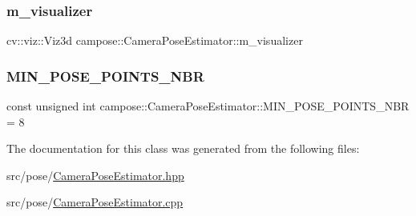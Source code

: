\subsubsection{\texorpdfstring{m\+\_\+visualizer}{m\_visualizer}}
{\footnotesize\ttfamily cv\+::viz\+::\+Viz3d campose\+::\+Camera\+Pose\+Estimator\+::m\+\_\+visualizer\hspace{0.3cm}{\ttfamily [private]}}

\mbox{\label{classcampose_1_1CameraPoseEstimator_ab9495b3f0c0be7276c853bfb97a40f3e}} 
\subsubsection{\texorpdfstring{M\+I\+N\+\_\+\+P\+O\+S\+E\+\_\+\+P\+O\+I\+N\+T\+S\+\_\+\+N\+BR}{MIN\_POSE\_POINTS\_NBR}}
{\footnotesize\ttfamily const unsigned int campose\+::\+Camera\+Pose\+Estimator\+::\+M\+I\+N\+\_\+\+P\+O\+S\+E\+\_\+\+P\+O\+I\+N\+T\+S\+\_\+\+N\+BR = 8\hspace{0.3cm}{\ttfamily [static]}}



The documentation for this class was generated from the following files\+:\begin{DoxyCompactItemize}
\item 
src/pose/\hyperlink{CameraPoseEstimator_8hpp}{Camera\+Pose\+Estimator.\+hpp}\item 
src/pose/\hyperlink{CameraPoseEstimator_8cpp}{Camera\+Pose\+Estimator.\+cpp}\end{DoxyCompactItemize}
